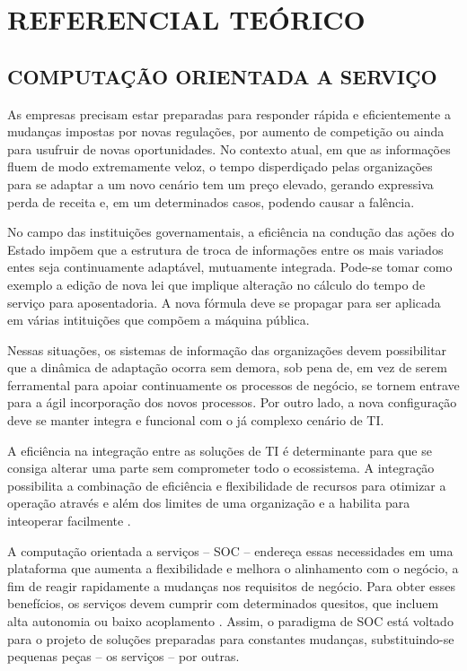  
\chapter{REFERENCIAL TEÓRICO}
\vspace{-6mm}

\section{COMPUTAÇÃO ORIENTADA A SERVIÇO}
\vspace{-6mm}


As empresas precisam estar preparadas para responder rápida e
eficientemente a mudanças impostas por novas regulações, por aumento de
competição ou ainda para usufruir de novas oportunidades. No contexto atual, em que as
informações fluem de modo extremamente veloz, o tempo disperdiçado pelas organizações para se
adaptar a um novo cenário tem um preço elevado, gerando expressiva perda de
receita e, em um determinados casos, podendo causar a falência.

No campo das instituições governamentais, a eficiência na condução das ações do
Estado impõem que a estrutura de troca de informações entre os mais variados
entes seja continuamente adaptável, mutuamente integrada. Pode-se tomar como
exemplo a edição de nova lei que implique alteração no cálculo do tempo de
serviço para aposentadoria. A nova fórmula deve se propagar para ser
aplicada em várias intituições que compõem a máquina pública.

Nessas situações, os sistemas de informação das organizações devem possibilitar
que a dinâmica de adaptação ocorra sem demora, sob pena de, em vez de serem
ferramental para apoiar continuamente os processos de negócio, se tornem entrave
para a ágil incorporação dos novos processos. Por outro lado, a nova
configuração deve se manter integra e funcional com o já complexo cenário de TI.

A eficiência na integração entre as soluções de TI é determinante para que se
consiga alterar uma parte sem comprometer todo o ecossistema. A integração
possibilita a combinação de eficiência e flexibilidade de recursos para otimizar
a operação através e além dos limites de uma organização e a habilita para
inteoperar facilmente \cite{papazoglou2008service}.

A computação orientada a serviços -- SOC -- endereça essas necessidades em uma
plataforma que aumenta a flexibilidade e melhora o alinhamento com o negócio, a
fim de reagir rapidamente a mudanças nos requisitos de negócio. Para obter esses
benefícios, os serviços devem cumprir com determinados quesitos, que incluem
alta autonomia ou baixo acoplamento \cite{erl2008soa}. Assim, o paradigma de SOC
está voltado para o projeto de soluções preparadas para constantes mudanças,
substituindo-se pequenas peças -- os serviços -- por outras.

